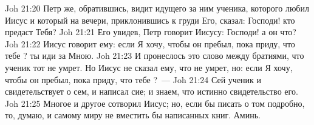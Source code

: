 \vs Joh 21:20 Петр же, обратившись, видит идущего за ним ученика, которого любил Иисус и который на вечери, приклонившись к груди Его, сказал: Господи! кто предаст Тебя?
\vs Joh 21:21 Его увидев, Петр говорит Иисусу: Господи! а он что?
\vs Joh 21:22 Иисус говорит ему: если Я хочу, чтобы он пребыл, пока приду, что тебе ? ты иди за Мною.
\vs Joh 21:23 И пронеслось это слово между братиями, что ученик тот не умрет. Но Иисус не сказал ему, что не умрет, но: если Я хочу, чтобы он пребыл, пока приду, что тебе ?~---
\vs Joh 21:24 Сей ученик и свидетельствует о сем, и написал сие; и знаем, что истинно свидетельство его.
\vs Joh 21:25 Многое и другое сотворил Иисус; но, если бы писать о том подробно, то, думаю, и самому миру не вместить бы написанных книг. Аминь.
